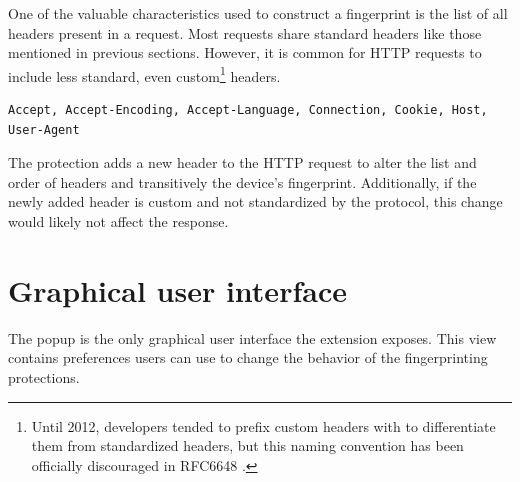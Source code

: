 One of the valuable characteristics used to construct a fingerprint is the list of all headers present in a request. Most requests share standard headers like those mentioned in previous sections. However, it is common for HTTP requests to include less standard, even custom\footnote{Until 2012, developers tended to prefix custom headers with  to differentiate them from standardized headers, but this naming convention has been officially discouraged in RFC6648 \cite{RFC6648}.} headers.

\bigbreak

\begin{lstlisting}[caption={An example of a list of headers present in an HTTP request.}]
Accept, Accept-Encoding, Accept-Language, Connection, Cookie, Host, User-Agent
\end{lstlisting}

\medbreak

The protection adds a new header to the HTTP request to alter the list and order of headers and transitively the device's fingerprint. Additionally, if the newly added header is custom and not standardized by the protocol, this change would likely not affect the response.

\section{Graphical user interface}
\label{Section:GUI}

The popup is the only graphical user interface the extension exposes. This view contains preferences users can use to change the behavior of the fingerprinting protections.

\medbreak

